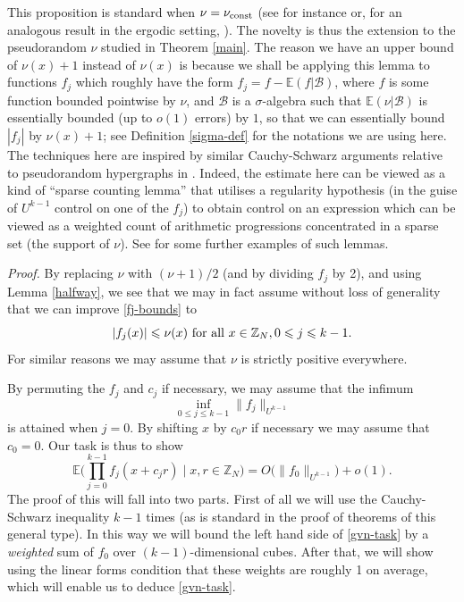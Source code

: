 \documentclass[12pt,a4paper,reqno]{amsart}
\numberwithin{equation}{section}
\theoremstyle{plain}
\theoremstyle{definition}
\renewcommand{\leq}{\leqslant}
\def\vconst{\ensuremath \nu_{\mbox{\scriptsize const}}}
\def\B{{\mathcal B}}
\def\E{{\mathbb E}}
\def\vs{\vspace{11pt}}
\def\ni{\noindent}
\def\proof{\noindent\textit{Proof. }}
\begin{document}
\ni {\it Remark.}  This proposition is standard when $\nu = \vconst$ (see for instance \cite[Theorem 3.2]{gowers} or, for an analogous result in the ergodic setting, \cite[Theorem 3.1]{FKO}). The 
novelty is thus the extension to the pseudorandom $\nu$ studied in Theorem \ref{main}.  The reason we have an upper bound of $\nu(x)+1$ instead
of $\nu(x)$ is because we shall be applying this lemma to functions $f_j$ which roughly have the form $f_j = f - \E(f|\B)$, where $f$ is some function bounded pointwise by $\nu$, and $\B$ is a $\sigma$-algebra such that $\E(\nu|\B)$ is essentially bounded (up to $o(1)$ errors)
by $1$, so that we can essentially bound $|f_j|$ by $\nu(x)+1$; see Definition \ref{sigma-def} for the notations we are using here.  
The techniques here are inspired by similar Cauchy-Schwarz arguments relative to pseudorandom hypergraphs in \cite{gowers-reg}.
Indeed, the estimate here can be viewed as a kind of ``sparse counting lemma'' that utilises a regularity hypothesis (in the guise of $U^{k-1}$ control
on one of the $f_j$) to obtain control on an expression which can be viewed as a weighted count of arithmetic progressions concentrated in
a sparse set (the support of $\nu$).  See \cite{gowers-reg,klr} for some further examples of such lemmas.
\vs

\proof  By replacing $\nu$ with $(\nu+1)/2$ (and by dividing $f_j$ by 2), and using Lemma \ref{halfway}, we see that we may in fact assume
without loss of generality that we can improve \eqref{fj-bounds} to
\begin{equation}\label{fj-bounds-better}
 |f_j(x)| \leq \nu(x) \hbox{ for all } x \in \mathbb{Z}_N, 0 \leq j \leq k-1.
\end{equation}
For similar reasons we may assume that $\nu$ is strictly positive everywhere.\vs

\ni By permuting the $f_j$ and $c_j$ if necessary, we may assume that the infimum \[ \inf_{0 \leq j \leq k-1}
\| f_j \|_{U^{k-1}}\] is attained when $j=0$.  By shifting $x$ by $c_0 r$ if necessary we may assume that $c_0 = 0$.
Our task is thus to show
\begin{equation}\label{gvn-task}
 \E\bigg( \prod_{j=0}^{k-1} f_j(x + c_j r) \; \bigg| \; x,r \in \mathbb{Z}_N \bigg) = O\big(\| f_0 \|_{U^{k-1}}\big) + o(1).
\end{equation}
The proof of this will fall into two parts. First of all we will use the Cauchy-Schwarz inequality $k - 1$ times (as is standard in the proof of theorems of this general type). In this way we will bound the left hand side of \eqref{gvn-task} by a \textit{weighted} sum of $f_0$ over $(k-1)$-dimensional cubes. After that, we will show using the linear forms condition that these weights are roughly 1 on average, which will enable us to deduce \eqref{gvn-task}.\vs
\end{document}

